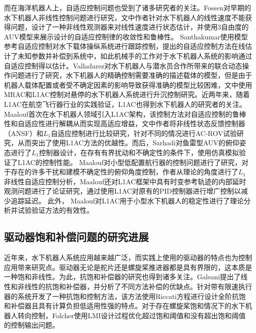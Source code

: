 而在海洋机器人上，自适应控制问题也受到了诸多研究者的关注\cite{wang2016fast,hassanein2016model}。Fossen对早期的水下机器人非线性控制问题进行研究，文中作者针对水下机器人的线性速度不能获得问题，设计了一种非线性观测器来对线性速度进行状态估计，并使用3自由度的AUV模型来展示设计的自适应控制律的收敛性和鲁棒性\cite{Fossen2002Marine,fossen1994guidance}。 Santhakumar使用模型参考自适应控制对水下载体操纵系统进行跟踪控制，提出的自适应控制方法在线估计了未知参数并补偿到系统中，如此机械手的工作对于水下机器人系统的影响通过自适应控制得以估计\cite{santhakumar2014robust}。Valladarez对水下机器人与潜水员合作所带来的联合动态操作问题进行了研究，水下机器人的精确控制需要准确的描述载体的模型，但是由于机器人载体配置或者受不确定因素的影响导致获得准确的模型比较困难，文中使用MRAC和L1AC控制对悬停的水下机器人系统进行升沉控制研究\cite{valladarez2015robust,valladarez2015adaptive}。近两年来，随着L1AC在航空飞行器行业的实践验证，L1AC也得到水下机器人的研究者的关注\cite{maalouf2012novel,sarhadi2014l1}。Maalouf首次在水下机器人领域引入L1AC架构，该控制方法对自适应控制的鲁棒性和自适应性进行解耦从而实现高适应增益，文中作者将非线性状态反馈控制器（ANSF）和$L_{1}$自适应控制进行比较研究，针对不同的情况进行AC-ROV试验研究，从而突出了使用L1AC方法的优越性\cite{maalouf2015l1,maalouf2012l1}。而后，Sarhadi对鱼雷型AUV的俯仰姿态进行了$L_{1}$控制器设计，在存有有界扰动和不确定性的条件下，使用仿真模拟验证了L1AC的控制性能\cite{maalouf2012l1}。 Maalouf对小型低配置航行器的控制问题进行了研究，对于存在的许多干扰和建模不确定性的俯仰角度控制，作者从理论的角度进行了$L_{1}$非线性自适应控制分析，Maalouf还对L1AC框架中具有时变参考轨迹的内部延时观测问题进行了论证研究，通过使用L1AC对原有的PID控制器进行增广控制以减少追踪延迟\cite{maalouf2013new}。 此外， Maalouf对L1AC用于小型水下机器人的稳定性进行了理论分析并试验验证方法的有效性\cite{maalouf2013stability,maalouf2015l1}。




\subsection{驱动器饱和补偿问题的研究进展  }

近年来，水下机器人系统应用越来越广泛，而实践上使用的驱动器的特点也为控制应用带来研究点。驱动器无论是舵片还是螺旋桨推进器都是具有界限的，这本质是一种饱和非线性。为此，抗饱和补偿器的研究也得到诸多关注\cite{galeani2009tutorial,Turner2017Positive,sofrony2010anti}。Galeani提出了线性和非线性的抗饱和补偿器，并分析了不同方法补偿的优缺点\cite{galeani2009tutorial}。针对带有限速执行器的系统开发了一种抗饱和控制方法，该方法使用Riccati方程进行设计全阶抗饱和补偿器且具有计算负担低适用性强的特点\cite{sofrony2010anti}。对于存在螺旋桨饱和情况下的水下机器人转向控制，Folcher使用LMI设计过程优化超过饱和阈值和没有超出饱和阈值的控制输出问题\cite{folcher2004lmi}。

